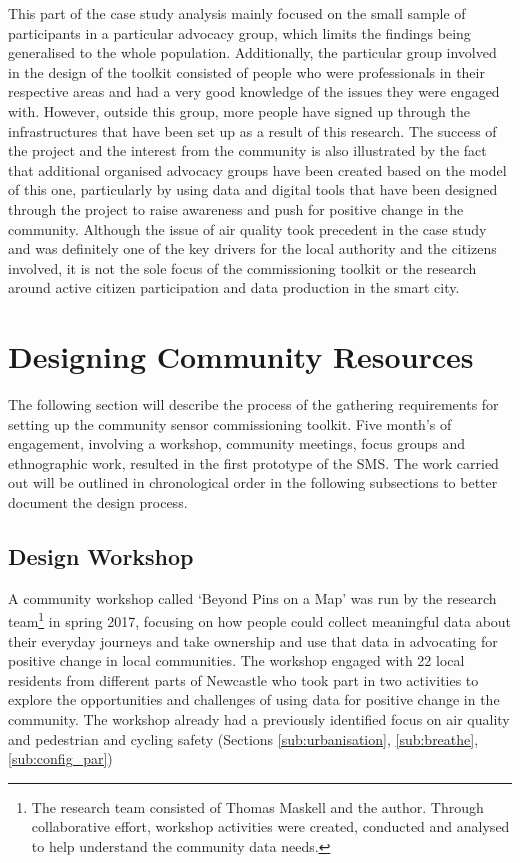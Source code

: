 This part of the case study analysis mainly focused on the small sample of participants in a particular advocacy group, which limits the findings being generalised to the whole population. Additionally, the particular group involved in the design of the toolkit consisted of people who were professionals in their respective areas and had a very good knowledge of the issues they were engaged with. However, outside this group, more people have signed up through the infrastructures that have been set up as a result of this research. The success of the project and the interest from the community is also illustrated by the fact that additional organised advocacy groups have been created based on the model of this one, particularly by using data and digital tools that have been designed through the project to raise awareness and push for positive change in the community. Although the issue of air quality took precedent in the case study and was definitely one of the key drivers for the local authority and the citizens involved, it is not the sole focus of the commissioning toolkit or the research around active citizen participation and data production in the smart city.


\section{Designing Community Resources}
\label{sec:design_sms}
The following section will describe the process of the gathering requirements for setting up the community sensor commissioning toolkit. Five month's of engagement, involving a workshop, community meetings, focus groups and ethnographic work, resulted in the first prototype of the SMS. The work carried out will be outlined in chronological order in the following subsections to better document the design process.

\subsection{Design Workshop}
\label{sub:pinsonamap}
A community workshop called `Beyond Pins on a Map' was run by the research team\footnote{The research team consisted of Thomas Maskell and the author. Through collaborative effort, workshop activities were created, conducted and analysed to help understand the community data needs.} in spring 2017, focusing on how people could collect meaningful data about their everyday journeys and take ownership and use that data in advocating for positive change in local communities. The workshop engaged with 22 local residents from different parts of Newcastle who took part in two activities to explore the opportunities and challenges of using data for positive change in the community. The workshop already had a previously identified focus on air quality and pedestrian and cycling safety (Sections \ref{sub:urbanisation}, \ref{sub:breathe}, \ref{sub:config_par})

